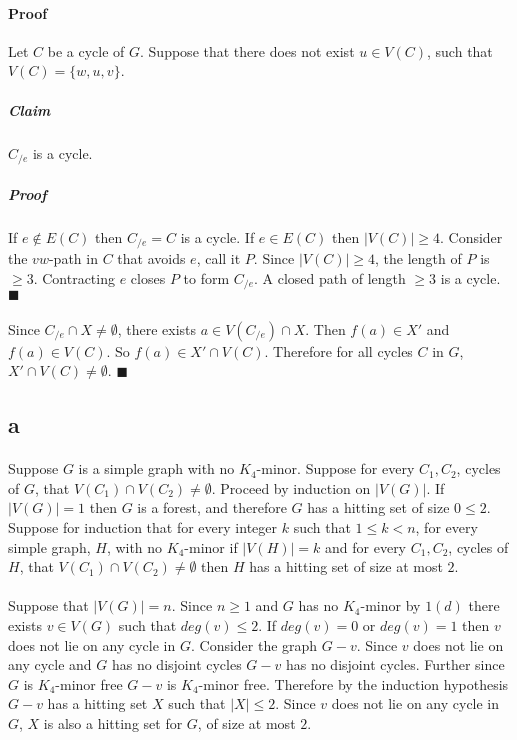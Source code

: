 \documentclass[letterpaper,12pt,oneside,onecolumn]{report}
\begin{document}
\paragraph{Proof}
Let $C$ be a cycle of $G$. Suppose that there does not exist $u \in V(C)$, such that $V(C) = \{w,u,v\}$.
\subparagraph{Claim}
$C_{/e}$ is a cycle.
\subparagraph{Proof}
If $e \not \in E(C)$ then $C_{/e} = C$ is a cycle. If $e \in E(C)$ then $|V(C)| \geq 4$. Consider the $vw$-path in $C$ that avoids $e$, call it $P$. Since $|V(C)| \geq 4$, the length of $P$ is $\geq 3$. Contracting $e$ closes $P$ to form $C_{/e}$. A closed path of length $\geq 3$ is a cycle. $\blacksquare$
\paragraph{}
Since $C_{/e} \cap X \neq \emptyset$, there exists $a \in V(C_{/e}) \cap X$. Then $f(a) \in X'$ and $f(a) \in  V(C)$. So $f(a) \in X' \cap V(C)$. Therefore for all cycles $C$ in $G$, $X' \cap V(C) \neq \emptyset$. $\blacksquare$
\subsection*{a}
\paragraph{}
Suppose $G$ is a simple graph with no $K_4$-minor. Suppose for every $C_1, C_2$, cycles of $G$, that $V(C_1) \cap V(C_2) \neq \emptyset$. Proceed by induction on $|V(G)|$. If $|V(G)|=1$ then $G$ is a forest, and therefore $G$ has a hitting set of size $0 \leq 2$. Suppose for induction that for every integer $k$ such that $1 \leq k < n$, for every simple graph, $H$, with no $K_4$-minor if $|V(H)| = k$ and for every $C_1, C_2$, cycles of $H$, that $V(C_1) \cap V(C_2) \neq \emptyset$ then $H$ has a hitting set of size at most $2$.
\paragraph{}
Suppose that $|V(G)| = n$. Since $n \geq 1$ and $G$ has no $K_4$-minor by $1(d)$ there exists $v \in V(G)$ such that $deg(v) \leq 2$. If $deg(v) = 0$ or $deg(v) = 1$ then $v$ does not lie on any cycle in $G$. Consider the graph $G - v$. Since $v$ does not lie on any cycle and $G$ has no disjoint cycles $G-v$ has no disjoint cycles. Further since $G$ is $K_4$-minor free $G-v$ is $K_4$-minor free. Therefore by the induction hypothesis $G-v$ has a hitting set $X$ such that $|X| \leq 2$. Since $v$ does not lie on any cycle in $G$, $X$ is also a hitting set for $G$, of size at most $2$.
\end{document}
